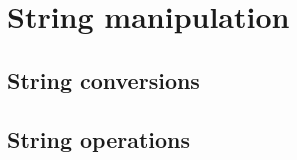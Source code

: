 \section{String manipulation \label{SEC:support:string}}

\subsection{String conversions \label{SEC:support:string:convert}}


\subsection{String operations \label{SEC:support:string:modify}}

